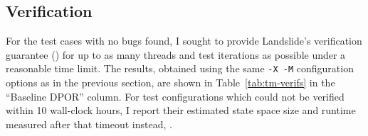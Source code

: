 \subsection{Verification}
\label{sec:tm-verif}

For the test cases with no bugs found, I sought to provide Landslide's verification guarantee
(\sect{\ref{sec:quicksand-id}})
for up to as many threads and test iterations as possible under a reasonable time limit.
The results, obtained using the same {\tt -X -M} configuration options as
in the previous section,
are shown in Table~\ref{tab:tm-verifs} in the ``Baseline DPOR'' column.
For test configurations which could not be verified
within 10 wall-clock hours,
I report their estimated state space size and runtime measured after that timeout instead,
.

